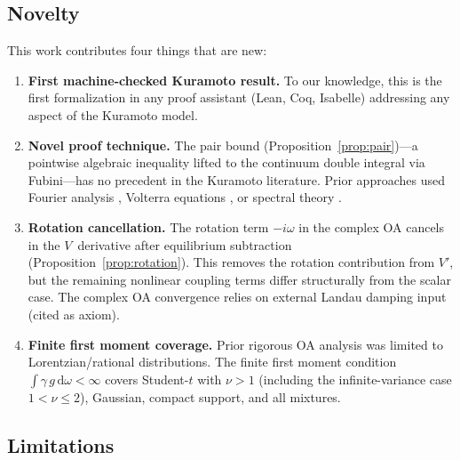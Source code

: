 \documentclass[11pt,a4paper]{article}
\theoremstyle{definition}
\begin{document}
\subsection{Novelty}

This work contributes four things that are new:

\begin{enumerate}
\item \textbf{First machine-checked Kuramoto result.} To our knowledge, this is the first formalization in any proof assistant (Lean, Coq, Isabelle) addressing any aspect of the Kuramoto model.

\item \textbf{Novel proof technique.} The pair bound (Proposition~\ref{prop:pair})---a pointwise algebraic inequality lifted to the continuum double integral via Fubini---has no precedent in the Kuramoto literature. Prior approaches used Fourier analysis \cite{dietert2016}, Volterra equations \cite{dietert-fernandez2018}, or spectral theory \cite{chiba2015}.

\item \textbf{Rotation cancellation.} The rotation term $-i\omega$ in the complex OA cancels in the $V$~derivative after equilibrium subtraction (Proposition~\ref{prop:rotation}). This removes the rotation contribution from $V'$, but the remaining nonlinear coupling terms differ structurally from the scalar case. The complex OA convergence relies on external Landau damping input (cited as axiom).

\item \textbf{Finite first moment coverage.} Prior rigorous OA analysis was limited to Lorentzian/rational distributions. The finite first moment condition $\int \gamma\,g\,\mathrm{d}\omega < \infty$ covers Student-$t$ with $\nu > 1$ (including the infinite-variance case $1 < \nu \leq 2$), Gaussian, compact support, and all mixtures.
\end{enumerate}

\subsection{Limitations}
\end{document}
